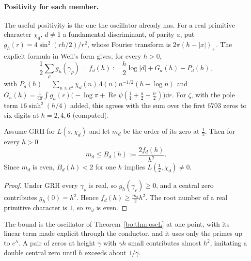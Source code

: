 \paragraph{Positivity for each member.} The useful positivity is the one the oscillator already has. For a real primitive character $\chi_d$, $d\ne1$ a fundamental discriminant, of parity $a$, put $g_h(r)=4\sin^2(rh/2)/r^2$, whose Fourier transform is $2\pi(h-|x|)_+$. The explicit formula in Weil's form gives, for every $h>0$,
\[
\frac12\sum_\rho g_h(\gamma_\rho)=f_d(h):=\frac h2\log|d|+G_a(h)-P_d(h),
\]
with $P_d(h)=\sum_{n\le e^h}\chi_d(n)\Lambda(n)n^{-1/2}(h-\log n)$ and $G_a(h)=\frac1{4\pi}\int g_h(r)\bigl(-\log\pi+\operatorname{Re}\psi(\frac14+\frac a2+\frac{ir}2)\bigr)\dd r$. For $\zeta$, with the pole term $16\sinh^2(h/4)$ added, this agrees with the sum over the first $6703$ zeros to six digits at $h=2,4,6$ (computed).

\begin{proposition}\label{bo:prop:famrank}
Assume GRH for $L(s,\chi_d)$ and let $m_d$ be the order of its zero at $\frac12$. Then for every $h>0$
\[
m_d\le B_d(h):=\frac{2f_d(h)}{h^2}.
\]
Since $m_d$ is even, $B_d(h)<2$ for one $h$ implies $L(\frac12,\chi_d)\ne0$.
\end{proposition}

\begin{proof}
Under GRH every $\gamma_\rho$ is real, so $g_h(\gamma_\rho)\ge0$, and a central zero contributes $g_h(0)=h^2$. Hence $f_d(h)\ge\frac{m_d}2h^2$. The root number of a real primitive character is $1$, so $m_d$ is even.
\end{proof}

The bound is the oscillator of Theorem~\ref{bo:thm:oscL} at one point, with its linear term made explicit through the conductor, and it uses only the primes up to $e^h$. A pair of zeros at height $\gamma$ with $\gamma h$ small contributes almost $h^2$, imitating a double central zero until $h$ exceeds about $1/\gamma$.

